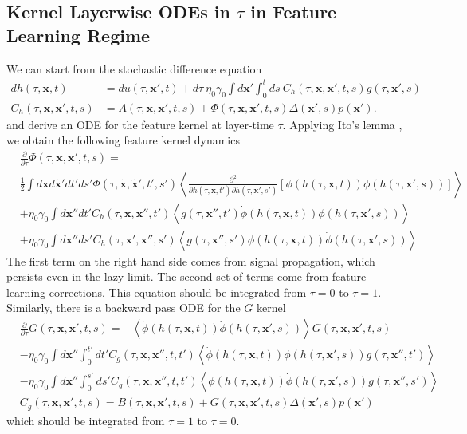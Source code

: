 \documentclass{article} %
\def\x{\bm x}
\begin{document}
\subsection{Kernel Layerwise ODEs in $\tau$ in Feature Learning Regime}\label{app:kernel_ODEs}

We can start from the stochastic difference equation
\begin{align}
    dh(\tau,\x,t) &= du(\tau,\x',t) + d\tau \  \eta_0 \gamma_0 \int d\x' \int_0^t ds \  C_h(\tau,\x,\x',t,s) g(\tau,\x',s)  \nonumber
    \\
     C_h(\tau,\x,\x',t,s) &= A(\tau,\x,\x',t,s) + \Phi(\tau,\x,\x',t,s) \Delta(\x',s) p(\x') . 
\end{align}
and derive an ODE for the feature kernel at layer-time $\tau$. Applying Ito's lemma \citep{ito1944109}, we obtain the following feature kernel dynamics
\begin{align}
    &\frac{\partial }{\partial \tau} \Phi(\tau,\x,\x',t,s) = \nonumber
    \\
    &\frac{1}{2} \int d\tilde{\x} d\tilde{\x}' dt' ds' \Phi(\tau,\tilde{\x}, \tilde{\x}',t',s') \left< \frac{\partial^2}{\partial h(\tau, \tilde{\x}, t') \partial h(\tau, \tilde{\x}', s') } [\phi(h(\tau,\x,t)) \phi(h(\tau,\x',s))] \right> \nonumber
    \\
    &+ \eta_0 \gamma_0 \int d\x''  dt' C_h(\tau,\x,\x'',t') \left< g(\tau,\x'',t') \dot\phi(h(\tau,\x,t)) \phi(h(\tau,\x',s))  \right> \nonumber
    \\
    &+ \eta_0 \gamma_0 \int d\x''  ds' C_h(\tau,\x',\x'',s') \left< g(\tau, \x'',s') \phi(h(\tau,\x,t)) \dot\phi(h(\tau,\x',s))  \right> 
\end{align}
The first term on the right hand side comes from signal propagation, which persists even in the lazy limit. The second set of terms come from feature learning corrections. This equation should be integrated from $\tau=0$ to $\tau =1$. Similarly, there is a backward pass ODE for the $G$ kernel
\begin{align}
    &\frac{\partial}{\partial \tau} G(\tau, \x,\x',t,s) = - \left< \dot\phi(h(\tau,\x,t)) \dot\phi(h(\tau,\x',s)) \right> G(\tau, \x,\x',t,s)  \nonumber
    \\
    &- \eta_0 \gamma_0 \int d\x'' \int_0^{t'} dt' C_g(\tau,\x,\x'',t,t') \left< \dot\phi(h(\tau,\x,t)) \phi(h(\tau,\x',s)) g(\tau,\x'',t')  \right>   \nonumber
    \\
     &- \eta_0 \gamma_0 \int d\x'' \int_0^{s'} ds' C_g(\tau,\x,\x'',t,t')  \left<  \phi(h(\tau,\x,t)) \dot\phi(h(\tau,\x',s)) g(\tau,\x'',s')  \right> \nonumber
     \\
     &C_g(\tau,\x,\x',t,s) =  B(\tau,\x,\x',t,s) + G(\tau,\x,\x',t,s) \Delta(\x',s) p(\x')
\end{align}
which should be integrated from $\tau = 1$ to $\tau = 0$. 
\end{document}
